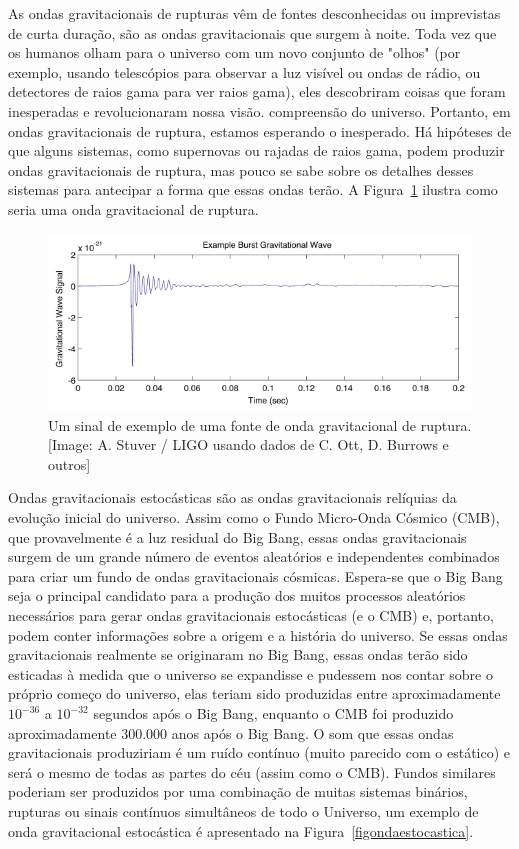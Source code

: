 As ondas gravitacionais de rupturas vêm de fontes desconhecidas ou imprevistas de curta duração, são as ondas gravitacionais que surgem à noite. Toda vez que os humanos olham para o universo com um novo conjunto de "olhos" (por exemplo, usando telescópios para observar a luz visível ou ondas de rádio, ou detectores de raios gama para ver raios gama), eles descobriram coisas que foram inesperadas e revolucionaram nossa visão. compreensão do universo. Portanto, em ondas gravitacionais de ruptura, estamos esperando o inesperado. Há hipóteses de que alguns sistemas, como supernovas ou rajadas de raios gama, podem produzir ondas gravitacionais de ruptura, mas pouco se sabe sobre os detalhes desses sistemas para antecipar a forma que essas ondas terão. A Figura~\ref{figondaruptura} ilustra como seria uma onda gravitacional de ruptura. 

\begin{figure}[ht]
\centering
\includegraphics[width=.9\textwidth]{figuras/burst_tn.jpg}
\caption{Um sinal de exemplo de uma fonte de onda gravitacional de ruptura. [Image: A. Stuver / LIGO usando dados de C. Ott, D. Burrows e outros]}
\label{figondaruptura}
\end{figure}

Ondas gravitacionais estocásticas são as ondas gravitacionais relíquias da evolução inicial do universo. Assim como o Fundo Micro-Onda Cósmico (CMB), que provavelmente é a luz residual do Big Bang, essas ondas gravitacionais surgem de um grande número de eventos aleatórios e independentes combinados para criar um fundo de ondas gravitacionais cósmicas. Espera-se que o Big Bang seja o principal candidato para a produção dos muitos processos aleatórios necessários para gerar ondas gravitacionais estocásticas (e o CMB) e, portanto, podem conter informações sobre a origem e a história do universo. Se essas ondas gravitacionais realmente se originaram no Big Bang, essas ondas terão sido esticadas à medida que o universo se expandisse e pudessem nos contar sobre o próprio começo do universo, elas teriam sido produzidas entre aproximadamente \(10^{-36}\) a \(10^{-32}\) segundos após o Big Bang, enquanto o CMB foi produzido aproximadamente 300.000 anos após o Big Bang. O som que essas ondas gravitacionais produziriam é um ruído contínuo (muito parecido com o estático) e será o mesmo de todas as partes do céu (assim como o CMB). Fundos similares poderiam ser produzidos por uma combinação de muitas sistemas binários, rupturas ou sinais contínuos simultâneos de todo o Universo, um exemplo de onda gravitacional estocástica é apresentado na Figura~\ref{figondaestocastica}.

